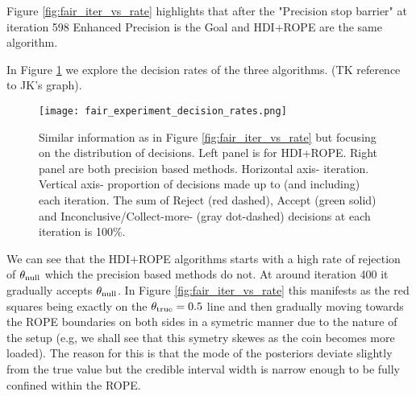 Figure \ref{fig:fair_iter_vs_rate} highlights that after the "Precision stop barrier" at iteration 598 Enhanced Precision is the Goal and HDI+ROPE are the same algorithm.

In Figure \ref{fig:fair_decisions} we explore the decision rates of the three algorithms.
(TK reference to JK's graph).

\begin{figure}[h!]
  \centering
  \texttt{[image: fair\_experiment\_decision\_rates.png]}
  \caption{Similar information as in Figure \ref{fig:fair_iter_vs_rate} but focusing on the distribution of decisions. Left panel is for HDI+ROPE. Right panel are both precision based methods. Horizontal axis- iteration. Vertical axis- proportion of decisions made up to (and including) each iteration. The sum of Reject (red dashed), Accept (green solid) and Inconclusive/Collect-more- (gray dot-dashed) decisions at each iteration is 100\%.
  }
  \label{fig:fair_decisions}
\end{figure}

We can see that the HDI+ROPE algorithms starts with a high rate of rejection of
$\theta_{\rm null}$ which the precision based methods do not. At around iteration 400
it gradually accepts $\theta_{\rm null}$. In Figure \ref{fig:fair_iter_vs_rate}
this manifests as the red squares being exactly on the $\theta_{\rm true}=0.5$ line
and then gradually moving towards the ROPE boundaries on both sides in a symetric
manner due to the nature of the setup (e.g, we shall see that this symetry
skewes as the coin becomes more loaded). The reason for this is that the mode of
the posteriors deviate slightly from the true value but the credible interval width
is narrow enough to be fully confined within the ROPE.

